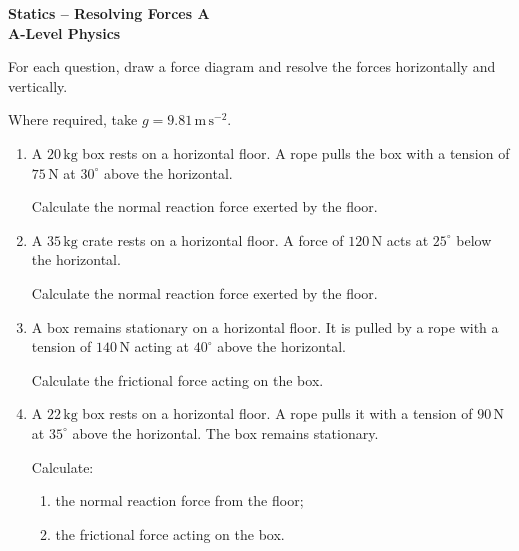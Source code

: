 \documentclass[12pt,a4paper]{article}
\begin{document}
\begin{center}
    {\Large\textbf{Statics -- Resolving Forces A}}\\[4pt]
    \textbf{A-Level Physics}
\end{center}

For each question, draw a force diagram and resolve the forces horizontally and vertically.

Where required, take \(g = 9.81\,\mathrm{m\,s^{-2}}\).

\vspace{0.4cm}

\begin{enumerate}[leftmargin=*, itemsep=1em]

\item
A \(20\,\mathrm{kg}\) box rests on a horizontal floor. A rope pulls the box with a tension of \(75\,\mathrm{N}\) at \(30^\circ\) above the horizontal.

Calculate the normal reaction force exerted by the floor.

\vspace{0.8cm}

\item
A \(35\,\mathrm{kg}\) crate rests on a horizontal floor. A force of \(120\,\mathrm{N}\) acts at \(25^\circ\) below the horizontal.

Calculate the normal reaction force exerted by the floor.

\vspace{0.8cm}

\item
A box remains stationary on a horizontal floor. It is pulled by a rope with a tension of \(140\,\mathrm{N}\) acting at \(40^\circ\) above the horizontal.

Calculate the frictional force acting on the box.

\vspace{0.8cm}

\item
A \(22\,\mathrm{kg}\) box rests on a horizontal floor. A rope pulls it with a tension of \(90\,\mathrm{N}\) at \(35^\circ\) above the horizontal. The box remains stationary.

Calculate:

\begin{enumerate}[label=(\alph*)]
    \item the normal reaction force from the floor;
    \item the frictional force acting on the box.
\end{enumerate}


\end{enumerate}
\end{document}
